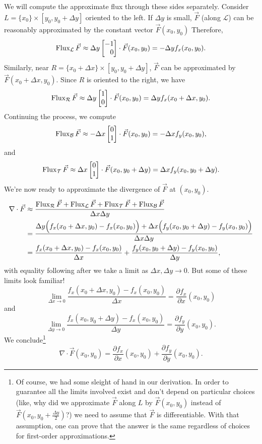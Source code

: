 We will compute the approximate flux through these sides separately.  Consider 
$L=\{x_0\}\times[y_0,y_0+\Delta y]$ oriented to the left.  If $\Delta y$ is small,
$\vec F$ (along $\mathcal L$) can be reasonably approximated by the constant vector
$\vec F(x_0,y_0)$  Therefore,
\[
	\Flux_{\mathcal L}\vec F \approx \Delta y \mat{-1\\0}\cdot \vec F(x_0,y_0) = -\Delta y f_x(x_0,y_0).
\]
Similarly, near $R=\{x_0+\Delta x\}\times [y_0,y_0+\Delta y]$, $\vec F$ can be approximated
by $\vec F(x_0+\Delta x,y_0)$.  Since $R$ is oriented to the right, we have
\[
	\Flux_{\mathcal R}\vec F \approx \Delta y \mat{1\\0}\cdot \vec F(x_0,y_0) = \Delta y f_x(x_0+\Delta x,y_0).
\]
Continuing the process, we compute
\[
	\Flux_{\mathcal B}\vec F \approx -\Delta x\mat{0\\1}\cdot \vec F(x_0,y_0) = -\Delta x f_y(x_0,y_0),
\]
and
\[
	\Flux_{\mathcal T}\vec F \approx \Delta x\mat{0\\1}\cdot \vec F(x_0,y_0+\Delta y) = \Delta x f_y(x_0,y_0+\Delta y).
\]
We're now ready to approximate the divergence of $\vec F$ at $(x_0,y_0)$.
\begin{align*}
	\nabla \cdot \vec F &\approx \frac{\operatorname{Flux}_{\mathcal R}\vec F + \operatorname{Flux}_{\mathcal L}\vec F + \operatorname{Flux}_{\mathcal T}\vec F + \operatorname{Flux}_{\mathcal B}\vec F}{\Delta x\Delta y}\\
		&= \frac{\Delta y\Big( f_x(x_0+\Delta x,y_0) - f_x(x_0,y_0)\Big)
		+\Delta x\Big( f_y(x_0,y_0+\Delta y) - f_y(x_0,y_0)\Big)}{\Delta x\Delta y}\\
		& = \frac{f_x(x_0+\Delta x,y_0) - f_x(x_0,y_0)}{\Delta x} + 
			\frac{f_y(x_0,y_0+\Delta y) - f_y(x_0,y_0)}{\Delta y},
\end{align*}
with equality following after we take a limit as $\Delta x,\Delta y\to 0$.  But some of these
limits look familiar!
\[
	\lim_{\Delta x\to 0} \frac{f_x(x_0+\Delta x,y_0) - f_x(x_0,y_0)}{\Delta x} 
	= \frac{\partial f_x}{\partial x}(x_0,y_0)
\]
and
\[
	\lim_{\Delta y\to 0} \frac{f_x(x_0,y_0+\Delta y) - f_x(x_0,y_0)}{\Delta y}
	= \frac{\partial f_y}{\partial y}(x_0,y_0).
\]
We conclude\footnote{ Of course, we had some sleight of hand in our derivation.  In order
to guarantee  all the limits involved exist and don't depend on particular choices
(like, why did we approximate $\vec F$ along $L$ by $\vec F(x_0,y_0)$ instead of
$\vec F(x_0,y_0+\tfrac{\Delta y}{2})$?) we need to assume that $\vec F$ is differentiable.
With that assumption, one can prove that the answer is the same regardless of choices
for first-order approximations.}
\[
	\nabla \cdot \vec F(x_0,y_0) = \frac{\partial f_x}{\partial x}(x_0,y_0)
	+ \frac{\partial f_y}{\partial y}(x_0,y_0).
\]

